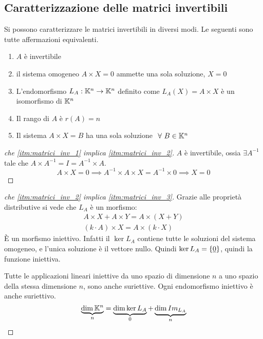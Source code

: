 \subsection{Caratterizzazione delle matrici invertibili}

Si possono caratterizzare le matrici invertibili in diversi modi. Le seguenti sono tutte affermazioni equivalenti.
\begin{enumerate}
    \item\label{itm:matrici_inv_1} $A$ \`e invertibile
    \item\label{itm:matrici_inv_2} il sistema omogeneo $A \times X = 0$ ammette una sola soluzione, $X = 0$
    \item\label{itm:matrici_inv_3} L'endomorfismo $L_A : \mathbb{K}^n \to \mathbb{K}^n$ definito come $L_A (X) = A \times X$ \`e un isomorfismo di $\mathbb{K}^n$
    \item\label{itm:matrici_inv_4} Il rango di $A$ \`e $r(A) = n$
    \item\label{itm:matrici_inv_5} Il sistema $A \times X = B$ ha una sola soluzione $\forall B \in \field^n$
\end{enumerate}

\begin{proof}[che \ref{itm:matrici_inv_1} implica \ref{itm:matrici_inv_2}]
$A$ \`e invertibile, ossia $\exists A^{-1}$ tale che $A \times A^{-1} = I = A^{-1} \times A$.
\[
A \times X = 0 \implies A^{-1} \times A \times X = A^{-1} \times 0 \implies X = 0
\]
\end{proof}

\begin{proof}[che \ref{itm:matrici_inv_2} implica \ref{itm:matrici_inv_3}]
Grazie alle propriet\`a distributive si vede che $L_A$ \`e un morfismo:
\begin{gather*}
A \times X + A \times Y = A \times (X + Y) \\
(k \cdot A) \times X = A \times (k \cdot X)
\end{gather*}
\`E un morfismo iniettivo. Infatti il $\ker L_A$ contiene tutte le soluzioni del sistema omogeneo, e l'unica soluzione \`e il vettore nullo. Quindi $\ker L_A = \{ \underline{0} \}$, quindi la funzione iniettiva.

Tutte le applicazioni lineari iniettive da uno spazio di dimensione $n$ a uno spazio della stessa dimensione $n$, sono anche suriettive. Ogni endomorfismo iniettivo \`e anche suriettivo.
\[
\underbrace{\dim \mathbb{K}^n}_{n} = \underbrace{\dim \ker L_A}_{0} + \underbrace{\dim Im_{L_A}}_{n}
\]
\end{proof}

